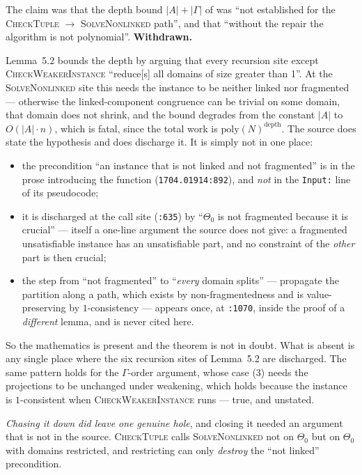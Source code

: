 The claim was that the depth bound $|A|+|\Gamma|$ of \cite[Lem.~5.2]{ZhukJACM}
was ``not established for the \textsc{CheckTuple} $\to$ \textsc{SolveNonlinked}
path'', and that ``without the repair the algorithm is not polynomial''.
\textbf{Withdrawn.}

Lemma~5.2 bounds the depth by arguing that every recursion site except
\textsc{CheckWeakerInstance} ``reduce[s] all domains of size greater than 1''.
At the \textsc{SolveNonlinked} site this needs the instance to be neither
linked nor fragmented --- otherwise the linked-component congruence can be
trivial on some domain, that domain does not shrink, and the bound degrades
from the constant $|A|$ to $O(|A|\cdot n)$, which is fatal, since the total
work is $\mathrm{poly}(N)^{\text{depth}}$. The source does state the hypothesis
and does discharge it. It is simply not in one place:

\begin{itemize}\tightlist
\item the precondition ``an instance that is not linked and not fragmented'' is
  in the prose introducing the function (\texttt{1704.01914:892}), and
  \emph{not} in the \texttt{Input:} line of its pseudocode;
\item it is discharged at the call site (\texttt{:635}) by ``$\Theta_{0}$ is
  not fragmented because it is crucial'' --- itself a one-line argument the
  source does not give: a fragmented unsatisfiable instance has an
  unsatisfiable part, and no constraint of the \emph{other} part is then
  crucial;
\item the step from ``not fragmented'' to ``\emph{every} domain splits'' ---
  propagate the partition along a path, which exists by non-fragmentedness and
  is value-preserving by $1$-consistency --- appears once, at \texttt{:1070},
  inside the proof of a \emph{different} lemma, and is never cited here.
\end{itemize}

So the mathematics is present and the theorem is not in doubt. What is absent
is any single place where the six recursion sites of Lemma~5.2 are discharged.
The same pattern holds for the $\Gamma$-order argument, whose case (3) needs
the projections to be unchanged under weakening, which holds because the
instance is $1$-consistent when \textsc{CheckWeakerInstance} runs --- true, and
unstated.

\emph{Chasing it down did leave one genuine hole}, and closing it needed an
argument that is not in the source. \textsc{CheckTuple} calls
\textsc{SolveNonlinked} not on $\Theta_{0}$ but on $\Theta_{0}$ with domains
restricted, and restricting can only \emph{destroy} the ``not linked''
precondition.

